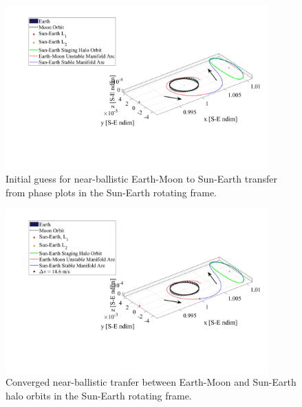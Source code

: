 \begin{figure}[H]
    \centering
    \includegraphics[width=0.9\textwidth]{figures/InitialGuess.pdf}
    \caption{Initial guess for near-ballistic Earth-Moon to Sun-Earth transfer from phase plots in the Sun-Earth rotating frame.}
    \label{fig:initialGuess}
\end{figure}

\begin{figure}[H]
    \centering
    \includegraphics[width=0.9\textwidth]{figures/Solution.pdf}
    \caption{Converged near-ballistic tranfer between Earth-Moon and Sun-Earth halo orbits in the Sun-Earth rotating frame.}
    \label{fig:solution}
\end{figure}
